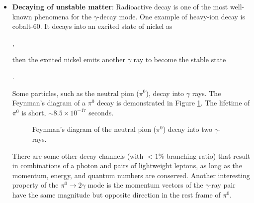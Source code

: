 
\begin{itemize}
    \item \textbf{Decaying of unstable matter}:
    Radioactive decay is one of the most well-known phenomena for the $\gamma$-decay mode. One example of heavy-ion decay is cobalt-60. It decays 
    into an excited state of nickel as

    ,

    then the excited nickel
    emits another $\gamma$ ray to become the stable state

    .

    Some particles, such as the neutral pion ($\pi^0$),
    decay into $\gamma$ rays.
    The Feynman's diagram of a $\pi^0$ decay is demonstrated in
    Figure \ref{fig:neutral_pion_decay}.
    The lifetime of $\pi^0$ is short, $\sim 8.5\times10^{-17}$ seconds.
    \begin{figure}[h!]
        \centering
        
        \caption{Feynman's diagram of the neutral pion ($\pi^0$) decay into two $\gamma$-rays.}
        \label{fig:neutral_pion_decay}
    \end{figure}
    There are some other decay channels (with $<1$\% branching
    ratio) that result in combinations of a photon and pairs of
    lightweight leptons, as long as the momentum, energy, and
    quantum numbers are conserved.
    Another interesting property of the $\pi^0\rightarrow 2\gamma$ mode
    is the momentum
    vectors of the $\gamma$-ray pair have the same magnitude but
    opposite direction in the rest frame of $\pi^0$.


\end{itemize}
